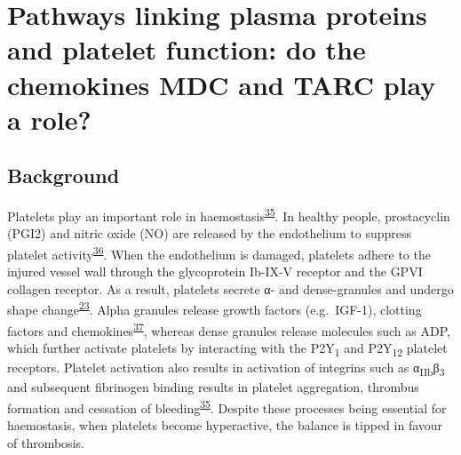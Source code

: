 \documentclass[11pt,twoside]{bristolthesis}
\begin{document}
\hypertarget{chemokine-platelets}{%
\chapter{Pathways linking plasma proteins and platelet function: do the chemokines MDC and TARC play a role?}\label{chemokine-platelets}}

\hypertarget{background-3}{%
\section{Background}\label{background-3}}

Platelets play an important role in haemostasis\textsuperscript{\protect\hyperlink{ref-Rivera2009}{35}}. In healthy people, prostacyclin (PGI2) and nitric oxide (NO) are released by the endothelium to suppress platelet activity\textsuperscript{\protect\hyperlink{ref-Yau2015}{36}}. When the endothelium is damaged, platelets adhere to the injured vessel wall through the glycoprotein Ib-IX-V receptor and the GPVI collagen receptor. As a result, platelets secrete α- and dense-granules and undergo shape change\textsuperscript{\protect\hyperlink{ref-Badimon2012}{23}}. Alpha granules release growth factors (e.g.~IGF-1), clotting factors and chemokines\textsuperscript{\protect\hyperlink{ref-Gear2003}{37}}, whereas dense granules release molecules such as ADP, which further activate platelets by interacting with the P2Y\textsubscript{1} and P2Y\textsubscript{12} platelet receptors. Platelet activation also results in activation of integrins such as α\textsubscript{IIb}β\textsubscript{3} and subsequent fibrinogen binding results in platelet aggregation, thrombus formation and cessation of bleeding\textsuperscript{\protect\hyperlink{ref-Rivera2009}{35}}. Despite these processes being essential for haemostasis, when platelets become hyperactive, the balance is tipped in favour of thrombosis.
\end{document}
